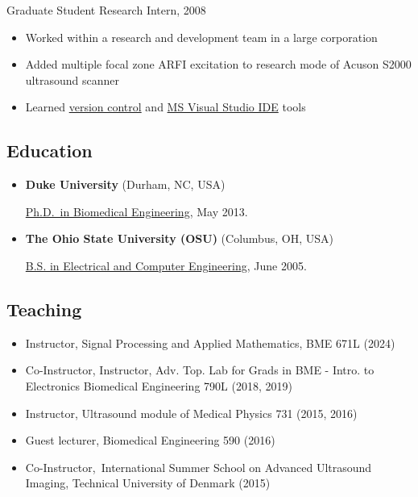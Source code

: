 \documentclass[
]{article}
\providecommand{\tightlist}{%
  \setlength{\itemsep}{0pt}\setlength{\parskip}{0pt}}
\begin{document}
\begin{itemize}
  Graduate Student Research Intern, 2008

  \begin{itemize}
  \tightlist
  \item
    Worked within a research and development team in a large corporation
  \item
    Added multiple focal zone ARFI excitation to research mode of Acuson
    S2000 ultrasound scanner
  \item
    Learned
    \href{http://www-03.ibm.com/software/products/en/clearcase}{version
    control} and \href{http://www.visualstudio.com/}{MS Visual Studio
    IDE} tools
  \end{itemize}
\end{itemize}

\subsection{Education}\label{education}

\begin{itemize}
\item
  \textbf{Duke University} (Durham, NC, USA)

  \href{http://bme.duke.edu/grad}{Ph.D.~in Biomedical Engineering}, May
  2013.
\item
  \textbf{The Ohio State University (OSU)} (Columbus, OH, USA)

  \href{http://ece.osu.edu/futurestudents/undergrad}{B.S. in Electrical
  and Computer Engineering}, June 2005.
\end{itemize}

\subsection{Teaching}\label{teaching}

\begin{itemize}
\tightlist
\item
  Instructor, Signal Processing and Applied Mathematics, BME 671L (2024)
\item
  Co-Instructor, Instructor, Adv. Top. Lab for Grads in BME - Intro. to
  Electronics Biomedical Engineering 790L (2018, 2019)
\item
  Instructor, Ultrasound module of Medical Physics 731 (2015, 2016)
\item
  Guest lecturer, Biomedical Engineering 590 (2016)
\item
  Co-Instructor,~International Summer School on Advanced Ultrasound
  Imaging, Technical University of Denmark (2015)
\end{itemize}
\end{document}
